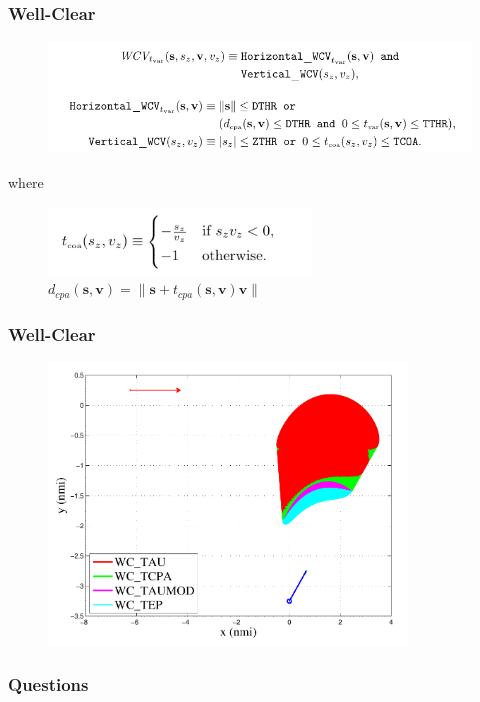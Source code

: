 \documentclass{beamer}
\begin{document}
\begin{frame}[fragile]
	\frametitle{Well-Clear}
	
	
	\begin{figure}
		\includegraphics[height=30mm]{images/WCV/wcv.pdf}\\
	\end{figure}
	where
	\begin{figure}
		\centering
		\includegraphics[height=18mm]{images/WCV/tcoa.pdf}\\
$d_{cpa} (\textbf{s},\textbf{v}) = \parallel \textbf{s} + t_{cpa}(\textbf{s}, \textbf{v})\textbf{v} \parallel$
	\end{figure}
	
\end{frame}

\begin{frame}[fragile]
	\frametitle{Well-Clear}
	
	
	\begin{figure}
		\includegraphics[height=75mm]{images/WCV/graph.pdf}\\
	\end{figure}
	
\end{frame}

\begin{frame}
	\frametitle{Questions}
\end{frame}
  	
\end{document}

